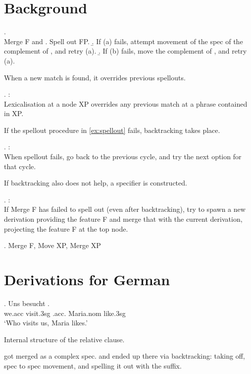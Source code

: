 \section{Background}

\ex. \\
Merge F and \label{ex:spellout}
 \a. Spell out FP.
 \b. If (a) fails, attempt movement of the spec of the complement of , and retry (a).
 \b. If (b) fails, move the complement of , and retry (a).

When a new match is found, it overrides previous spellouts.

\ex.  \citep{starke2018}:\\
Lexicalisation at a node XP overrides any previous match at a phrase contained in XP.

If the spellout procedure in \ref{ex:spellout} fails, backtracking takes place.

\ex.  \citep{starke2018}:\\
When spellout fails, go back to the previous cycle, and try the next option for that cycle.\label{ex:backtracking}

If backtracking also does not help, a specifier is constructed.

\ex.  \citep{starke2018}:\\
If Merge F has failed to spell out (even after backtracking), try to spawn a new derivation providing the feature F and merge that with the current derivation, projecting the feature F at the top node.\label{ex:specformation}

\ex. Merge F, Move XP, Merge XP

\phantom{hi}



\section{Derivations for German}

\exg. Uns besucht   .\\
 we.\ac{acc} visit.3\ac{sg}\scsub{[nom]} .\ac{acc}. Maria.\ac{nom} like.3\ac{sg}\scsub{[acc]}\\
 `Who visits us, Maria likes.' 

Internal structure of the relative clause.

 got merged as a complex spec.  and  ended up there via backtracking: taking  off, spec to spec movement, and spelling it out with the suffix.

